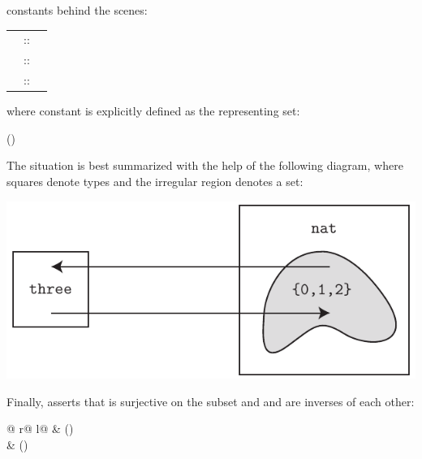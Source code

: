 \begin{isabellebody}
\begin{isamarkuptext}
constants behind the scenes:
\begin{center}
\begin{tabular}{rcl}
\isa{three} &::& \isa{nat\ set} \\
\isa{Rep{\isaliteral{5F}{\isacharunderscore}}three} &::& \isa{three\ {\isaliteral{5C3C52696768746172726F773E}{\isasymRightarrow}}\ nat}\\
\isa{Abs{\isaliteral{5F}{\isacharunderscore}}three} &::& \isa{nat\ {\isaliteral{5C3C52696768746172726F773E}{\isasymRightarrow}}\ three}
\end{tabular}
\end{center}
where constant  is explicitly defined as the representing set:
\begin{center}
\hfill()
\end{center}
The situation is best summarized with the help of the following diagram,
where squares denote types and the irregular region denotes a set:
\begin{center}
\includegraphics[scale=.8]{typedef}
\end{center}
Finally,  asserts that  is
surjective on the subset  and  and  are inverses of each other:
\begin{center}
\begin{tabular}{@ {}r@ {\qquad\qquad}l@ {}}
 & () \\
 & () \\

\end{tabular}
\end{center}
\end{isamarkuptext}
\end{isabellebody}
